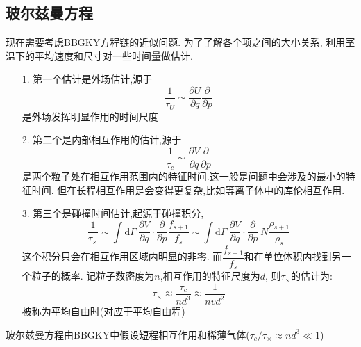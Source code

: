 \subsection{玻尔兹曼方程}
    现在需要考虑BBGKY方程链的近似问题. 为了了解各个项之间的大小关系, 利用室温下的平均速度和尺寸对一些时间量做估计.
    \begin{itemize}
      \item[1.]第一个估计是外场估计,源于
        \[\frac{1}{\tau_{U}} \sim \dfrac{\partial U}{\partial q}\dfrac{\partial }{\partial p}\]
        是外场发挥明显作用的时间尺度
      \item[2.]第二个是内部相互作用的估计,源于
        \[\frac{1}{\tau_{c}} \sim \dfrac{\partial V}{\partial q}\dfrac{\partial }{\partial p} \]
        是两个粒子处在相互作用范围内的特征时间.这一般是问题中会涉及的最小的特征时间. 但在长程相互作用是会变得更复杂,比如等离子体中的库伦相互作用.
      \item[3.]第三个是碰撞时间估计,起源于碰撞积分,
        \[\frac{1}{\tau_{\times}} \sim  \int \mathrm{d} \Gamma ~\dfrac{\partial V}{\partial q}\cdot\dfrac{\partial }{\partial p} \frac{f_{s+1}}{f_{s}} \sim  \int \mathrm{d} \Gamma ~\dfrac{\partial V}{\partial q}\cdot \dfrac{\partial }{\partial p} ~N \frac{\rho_{s+1}}{\rho_{s}}\]
        这个积分只会在相互作用区域内明显的非零. 而$\dfrac{f_{s+1}}{f_{s}}$和在单位体积内找到另一个粒子的概率. 记粒子数密度为$n$,相互作用的特征尺度为$d$, 则$\tau_{\times}$的估计为:
        \[\tau_{\times} \approx  \frac{\tau_{c}}{nd^{3}} \approx  \frac{1}{nvd^{2}}\]
        被称为平均自由时(对应于平均自由程)
    \end{itemize}

    玻尔兹曼方程由BBGKY中假设短程相互作用和稀薄气体($\tau_{c} / \tau_{\times} \approx  nd^{3} \ll 1$)
        
